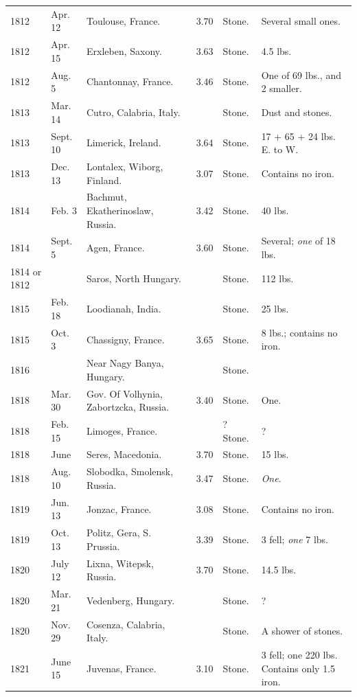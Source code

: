 \documentclass[a4paper, 12pt, oneside]{article}
\begin{document}
\begin{center}
\begin{longtable}{|p{10mm}|p{15mm}|p{32mm}|p{13mm}|p{13mm}|p{26mm}|}
        1812 & Apr. 12 & Toulouse, France. & 3.70 & Stone. & Several small ones. \\
        1812 & Apr. 15 & Erxleben, Saxony. & 3.63 & Stone. & 4.5 lbs. \\
        1812 & Aug. 5 & Chantonnay, France. & 3.46 & Stone. & One of 69 lbs., and 2 smaller. \\
        1813 & Mar. 14 & Cutro, Calabria, Italy. & ~ & Stone. & Dust and stones. \\
        1813 & Sept. 10 & Limerick, Ireland. & 3.64 & Stone. & 17 + 65 + 24 lbs. E. to W. \\
        1813 & Dec. 13 & Lontalex, Wiborg, Finland. & 3.07 & Stone. & Contains no iron. \\
        1814 & Feb. 3 & Bachmut, Ekatherinoslaw, Russia. & 3.42 & Stone. & 40 lbs. \\
        1814 & Sept. 5 & Agen, France. & 3.60 & Stone. & Several; \emph{one} of 18 lbs. \\
        1814 or 1812 & ~ & Saros, North Hungary. & ~ & Stone. & 112 lbs. \\
        1815 & Feb. 18 & Loodianah, India. & ~ & Stone. & 25 lbs. \\
        1815 & Oct. 3 & Chassigny, France. & 3.65 & Stone. & 8 lbs.; contains no iron. \\
        1816 & ~ & Near Nagy Banya, Hungary. & ~ & Stone. & ~ \\
        1818 & Mar. 30 & Gov. Of Volhynia, Zabortzcka, Russia. & 3.40 & Stone. & One. \\
        1818 & Feb. 15 & Limoges, France. & ~ & ? Stone. & ? \\
        1818 & June & Seres, Macedonia. & 3.70 & Stone. & 15 lbs. \\
        1818 & Aug. 10 & Slobodka, Smolensk, Russia. & 3.47 & Stone. & \emph{One}. \\
        1819 & Jun. 13 & Jonzac, France. & 3.08 & Stone. & Contains no iron. \\
        1819 & Oct. 13 & Politz, Gera, S. Prussia. & 3.39 & Stone. & 3 fell; \emph{one} 7 lbs. \\
        1820 & July 12 & Lixna, Witepsk, Russia. & 3.70 & Stone. & 14.5 lbs. \\
        1820 & Mar. 21 & Vedenberg, Hungary. & ~ & Stone. & ? \\
        1820 & Nov. 29 & Cosenza, Calabria, Italy. & ~ & Stone. & A shower of stones. \\
        1821 & June 15 & Juvenas, France. & 3.10 & Stone. & 3 fell; one 220 lbs. Contains only 1.5 iron. \\

\end{longtable}
\end{center}
\end{document}
